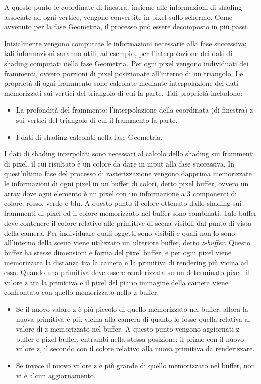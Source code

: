 A questo punto le coordinate di finestra, insieme alle informazioni di shading associate ad ogni vertice, vengono convertite in pixel sullo schermo. Come avvenuto per la  fase Geometria, il processo può essere decomposto in più passi.

Inizialmente vengono computate le informazioni necessarie alla fase successiva; tali informazioni saranno utili, ad esempio, per l’interpolazione dei dati di shading computati nella fase Geometria.
Per ogni pixel vengono individuati dei frammenti, ovvero porzioni di pixel posizionate all’interno di un triangolo. Le proprietà di ogni frammento sono calcolate mediante interpolazione dei dati memorizzati sui vertici del triangolo di cui fa parte. 
Tali proprietà includono:

\begin{itemize}
\item La profondità del frammento: l’interpolazione della coordinata (di finestra) z sui vertici del triangolo di cui il frammento fa parte.
\item I dati di shading calcolati nella fase Geometria.
\end{itemize}

I dati di shading interpolati sono necessari al calcolo dello shading sui frammenti di pixel, il cui risultato è un colore da dare in input alla fase successiva.
In quest’ultima fase del processo di rasterizzazione vengono dapprima memorizzate le informazioni di ogni pixel in un buffer di colori, detto pixel buffer, ovvero un array dove ogni elemento è un pixel con un informazione a 3 componenti di colore: rosso, verde e blu.
A questo punto il colore ottenuto dallo shading sui frammenti di pixel ed il colore memorizzato nel buffer sono combinati.
Tale buffer deve contenere il colore relativo alle primitive di scena visibili dal punto di vista della camera. 
Per individuare quali oggetti sono visibili e quali non lo sono all’interno della scena viene utilizzato un ulteriore buffer, detto \emph{z-buffer}. Questo buffer ha stesse dimensioni e forma del pixel buffer, e per ogni pixel viene memorizzata la distanza tra la camera e la primitiva di rendering più vicina ad essa.
Quando una primitiva deve essere renderizzata su un determinato pixel, il valore z tra la primitiva e il pixel del piano immagine della camera viene confrontato con quello memorizzato nello z buffer:

\begin{itemize}
\item Se il nuovo valore z è più piccolo di quello memorizzato nel buffer, allora la nuova primitiva è più vicina alla camera di quanto lo fosse quella relativa al valore di z memorizzato nel buffer. A questo punto vengono aggiornati z-buffer e pixel buffer, entrambi nella stessa posizione: il primo con il nuovo valore z, il secondo con il colore relativo alla nuova primitiva da renderizzare. 
\item Se invece il nuovo valore z è più grande di quello memorizzato nel buffer, non vi è alcun aggiornamento.
\end{itemize}

